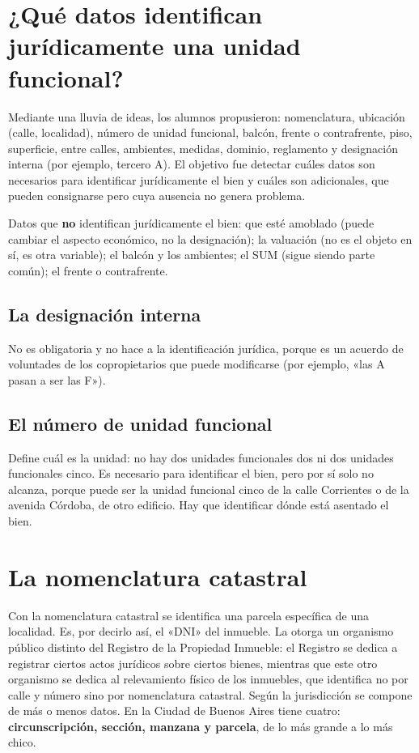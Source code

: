 \documentclass[12pt,oneside]{book}
\begin{document}
\section{¿Qué datos identifican jurídicamente una unidad funcional?}

Mediante una lluvia de ideas, los alumnos propusieron: nomenclatura, ubicación (calle, localidad), número de unidad funcional, balcón, frente o contrafrente, piso, superficie, entre calles, ambientes, medidas, dominio, reglamento y designación interna (por ejemplo, tercero A). El objetivo fue detectar cuáles datos son necesarios para identificar jurídicamente el bien y cuáles son adicionales, que pueden consignarse pero cuya ausencia no genera problema.

Datos que \textbf{no} identifican jurídicamente el bien: que esté amoblado (puede cambiar el aspecto económico, no la designación); la valuación (no es el objeto en sí, es otra variable); el balcón y los ambientes; el SUM (sigue siendo parte común); el frente o contrafrente.

\subsection{La designación interna}

No es obligatoria y no hace a la identificación jurídica, porque es un acuerdo de voluntades de los copropietarios que puede modificarse (por ejemplo, «las A pasan a ser las F»).

\subsection{El número de unidad funcional}

Define cuál es la unidad: no hay dos unidades funcionales dos ni dos unidades funcionales cinco. Es necesario para identificar el bien, pero por sí solo no alcanza, porque puede ser la unidad funcional cinco de la calle Corrientes o de la avenida Córdoba, de otro edificio. Hay que identificar dónde está asentado el bien.

\section{La nomenclatura catastral}

Con la nomenclatura catastral se identifica una parcela específica de una localidad. Es, por decirlo así, el «DNI» del inmueble. La otorga un organismo público distinto del Registro de la Propiedad Inmueble: el Registro se dedica a registrar ciertos actos jurídicos sobre ciertos bienes, mientras que este otro organismo se dedica al relevamiento físico de los inmuebles, que identifica no por calle y número sino por nomenclatura catastral. Según la jurisdicción se compone de más o menos datos. En la Ciudad de Buenos Aires tiene cuatro: \textbf{circunscripción, sección, manzana y parcela}, de lo más grande a lo más chico.
\end{document}
